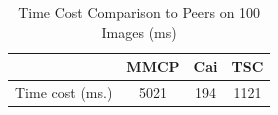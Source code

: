 \begin{table}[th]
\centering
\caption{Time Cost Comparison to Peers on 100 Images (ms)}
\small
\begin{tabular}{|l|c|c|c|}
\hline
{\bf } &   MMCP &   Cai &  {\bf TSC}  \\
\hline
 Time cost (ms.) &            5021  &       194  &      1121     \\
\hline
\end{tabular}
\label{tab:timepeer}
\end{table}


